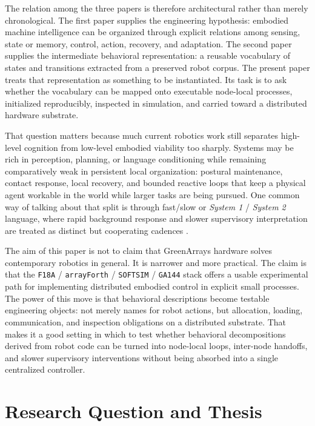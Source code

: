 \documentclass[11pt]{article}
\begin{document}
The relation among the three papers is therefore architectural rather than
merely chronological. The first paper supplies the engineering hypothesis:
embodied machine intelligence can be organized through explicit relations
among sensing, state or memory, control, action, recovery, and adaptation.
The second paper supplies the intermediate behavioral representation: a
reusable vocabulary of states and transitions extracted from a preserved
robot corpus. The present paper treats that representation as something to
be instantiated. Its task is to ask whether the vocabulary can be mapped
onto executable node-local processes, initialized reproducibly, inspected in
simulation, and carried toward a distributed hardware substrate.

That question matters because much current robotics work still separates
high-level cognition from low-level embodied viability too sharply. Systems
may be rich in perception, planning, or language conditioning while
remaining comparatively weak in persistent local organization: postural
maintenance, contact response, local recovery, and bounded reactive loops
that keep a physical agent workable in the world while larger tasks are
being pursued. One common way of talking about that split is through
fast/slow or \emph{System 1} / \emph{System 2} language, where rapid
background response and slower supervisory interpretation are treated as
distinct but cooperating cadences \citep{kahneman2011thinking,wang2025hume}.

The aim of this paper is not to claim that GreenArrays hardware solves
contemporary robotics in general. It is narrower and more practical. The
claim is that the \texttt{F18A} / \texttt{arrayForth} /
\texttt{SOFTSIM} / \texttt{GA144} stack offers a usable experimental path
for implementing distributed embodied control in explicit small processes.
The power of this move is that behavioral descriptions become testable
engineering objects: not merely names for robot actions, but allocation,
loading, communication, and inspection obligations on a distributed
substrate.
That makes it a good setting in which to test whether behavioral
decompositions derived from robot code can be turned into node-local loops,
inter-node handoffs, and slower supervisory interventions without being
absorbed into a single centralized controller.

\section{Research Question and Thesis}
\end{document}
